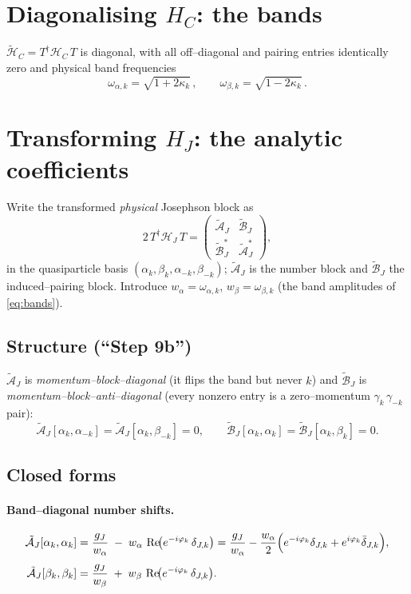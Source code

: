 \documentclass[11pt]{article}
\newcommand{\dJ}{\delta_{J,k}}
\newcommand{\dJb}{\bar\delta_{J,k}}
\newcommand{\kk}{\kappa_k}
\newcommand{\ph}{\varphi_k}
\newcommand{\gJ}{g_J}
\newcommand{\wa}{w_{\alpha}}
\newcommand{\wb}{w_{\beta}}
\newcommand{\oa}{\omega_{\alpha,k}}
\newcommand{\ob}{\omega_{\beta,k}}
\newcommand{\AJ}{\tilde{\mathcal{A}}_J}
\newcommand{\BJ}{\tilde{\mathcal{B}}_J}
\renewcommand{\Re}{\operatorname{Re}}
\begin{document}
\section{Diagonalising \texorpdfstring{$H_C$}{HC}: the bands}\label{sec:bands}

$\tilde{\mathcal H}_C=T^{\dagger}\mathcal H_C\,T$ is diagonal, with all off--diagonal
and pairing entries identically zero and physical band frequencies
\begin{equation}\label{eq:bands}
  \boxed{\;
  \oa=\sqrt{1+2\kk}\,,
  \qquad
  \ob=\sqrt{1-2\kk}\,.
  \;}
\end{equation}

\section{Transforming \texorpdfstring{$H_J$}{HJ}: the analytic coefficients}\label{sec:HJ}

Write the transformed \emph{physical} Josephson block as
\[
  2\,T^{\dagger}\mathcal H_J\,T=
  \begin{pmatrix} \AJ & \BJ\\ \BJ^{*} & \AJ^{*}\end{pmatrix},
\]
in the quasiparticle basis $(\alpha_k,\beta_k,\alpha_{-k},\beta_{-k})$; $\AJ$ is the
number block and $\BJ$ the induced--pairing block. Introduce
$\wa=\oa$, $\wb=\ob$ (the band amplitudes of \eqref{eq:bands}).

\subsection{Structure (``Step 9b'')}

$\AJ$ is \emph{momentum--block--diagonal} (it flips the band but never $k$) and
$\BJ$ is \emph{momentum--block--anti--diagonal} (every nonzero entry is a
zero--momentum $\gamma_k\,\gamma_{-k}$ pair):
\begin{equation}\label{eq:zeros}
  \AJ[\alpha_k,\alpha_{-k}]=\AJ[\alpha_k,\beta_{-k}]=0,
  \qquad
  \BJ[\alpha_k,\alpha_k]=\BJ[\alpha_k,\beta_k]=0 .
\end{equation}

\subsection{Closed forms}

\paragraph{Band--diagonal number shifts.}
\begin{align}
  \AJ[\alpha_k,\alpha_k]
    &= \frac{\gJ}{\wa}\;-\;\wa\,\Re\!\bigl(e^{-i\ph}\,\dJ\bigr)
     = \frac{\gJ}{\wa}-\frac{\wa}{2}\Bigl(e^{-i\ph}\dJ+e^{i\ph}\dJb\Bigr),
     \label{eq:AJaa}\\[4pt]
  \AJ[\beta_k,\beta_k]
    &= \frac{\gJ}{\wb}\;+\;\wb\,\Re\!\bigl(e^{-i\ph}\,\dJ\bigr).
     \label{eq:AJbb}
\end{align}
\end{document}
